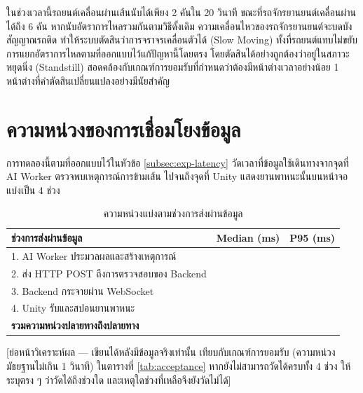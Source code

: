 ในช่วงเวลานี้รถยนต์เคลื่อนผ่านเส้นนับได้เพียง 2 คันใน 20 วินาที ขณะที่รถจักรยานยนต์เคลื่อนผ่านได้ถึง 6 คัน หากนับอัตราการไหลรวมกันตามวิธีดั้งเดิม ความเคลื่อนไหวของรถจักรยานยนต์จะบดบังสัญญาณรถติด ทำให้ระบบตัดสินว่าการจราจรเคลื่อนตัวได้ (Slow Moving) ทั้งที่รถยนต์แทบไม่ขยับ การแยกอัตราการไหลตามที่ออกแบบไว้แก้ปัญหานี้โดยตรง โดยตัดสินได้อย่างถูกต้องว่าอยู่ในสภาวะหยุดนิ่ง (Standstill) สอดคล้องกับเกณฑ์การยอมรับที่กำหนดว่าต้องมีหน้าต่างเวลาอย่างน้อย 1 หน้าต่างที่คำตัดสินเปลี่ยนแปลงอย่างมีนัยสำคัญ

\section{ความหน่วงของการเชื่อมโยงข้อมูล}
\label{sec:res-latency}

การทดลองนี้ตามที่ออกแบบไว้ในหัวข้อ \ref{subsec:exp-latency} วัดเวลาที่ข้อมูลใช้เดินทางจากจุดที่ AI Worker ตรวจพบเหตุการณ์การข้ามเส้น ไปจนถึงจุดที่ Unity แสดงยานพาหนะนั้นบนหน้าจอ แบ่งเป็น 4 ช่วง

\begin{table}[ht]
\centering
\caption{ความหน่วงแบ่งตามช่วงการส่งผ่านข้อมูล}
\label{tab:latency}
\begin{tabular}{|l|c|c|}
\hline
ช่วงการส่งผ่านข้อมูล & Median (ms) & P95 (ms) \\
\hline
1. AI Worker ประมวลผลและสร้างเหตุการณ์ & & \\
\hline
2. ส่ง HTTP POST ถึงการตรวจสอบของ Backend & & \\
\hline
3. Backend กระจายผ่าน WebSocket & & \\
\hline
4. Unity รับและสปอนยานพาหนะ & & \\
\hline
\textbf{รวมความหน่วงปลายทางถึงปลายทาง} & \textbf{} & \textbf{} \\
\hline
\end{tabular}
\end{table}

[ย่อหน้าวิเคราะห์ผล — เขียนได้หลังมีข้อมูลจริงเท่านั้น เทียบกับเกณฑ์การยอมรับ (ความหน่วงมัธยฐานไม่เกิน 1 วินาที) ในตารางที่ \ref{tab:acceptance} หากยังไม่สามารถวัดได้ครบทั้ง 4 ช่วง ให้ระบุตรง ๆ ว่าวัดได้ถึงช่วงใด และเหตุใดช่วงที่เหลือจึงยังวัดไม่ได้]

